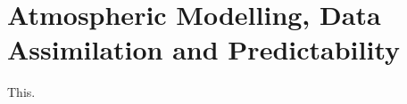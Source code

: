 \chapter{Atmospheric Modelling, Data Assimilation and Predictability}
\label{ch:kalnay}

This\citep{kalnay_atmospheric_2003}.

